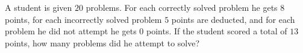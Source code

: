 A student is given $20$ problems. For each correctly solved problem he gets $8$ points, for each incorrectly solved problem $5$ points are deducted, and for each problem he did not attempt he gets $0$ points. If the student scored a total of $13$ points, how many problems did he attempt to solve?
